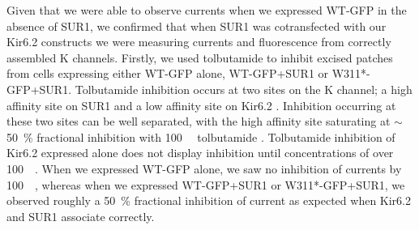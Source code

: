 Given that we were able to observe currents when we expressed WT-GFP in the absence of SUR1, we confirmed that when SUR1 was cotransfected with our Kir6.2 constructs we were measuring currents and fluorescence from correctly assembled K\ATP{} channels.
Firstly, we used tolbutamide to inhibit excised patches from cells expressing either WT-GFP alone, WT-GFP+SUR1 or W311*-GFP+SUR1.
Tolbutamide inhibition occurs at two sites on the K\ATP{} channel; a high affinity site on SUR1 and a low affinity site on Kir6.2 \cite{gribble_tissue_1998, ashfield_identification_1999}.
Inhibition occurring at these two sites can be well separated, with the high affinity site saturating at $\sim$\SI{50}{\percent} fractional inhibition with \SI{100}{\micro\Molar} tolbutamide .
Tolbutamide inhibition of Kir6.2 expressed alone does not display inhibition until concentrations of over \SI{100}{\micro\Molar}.
When we expressed WT-GFP alone, we saw no inhibition of currents by \SI{100}{\micro\Molar}, whereas when we expressed WT-GFP+SUR1 or W311*-GFP+SUR1, we observed roughly a \SI{50}{\percent} fractional inhibition of current as expected when Kir6.2 and SUR1 associate correctly.

